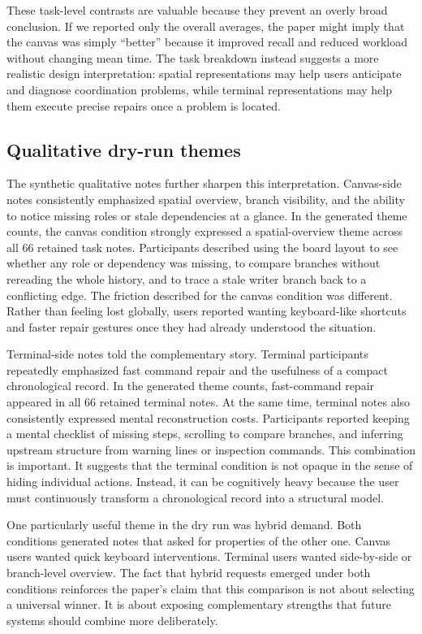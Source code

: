 \documentclass[sigconf]{acmart}
\begin{document}
These task-level contrasts are valuable because they prevent an overly broad conclusion. If we reported only the overall averages, the paper might imply that the canvas was simply ``better'' because it improved recall and reduced workload without changing mean time. The task breakdown instead suggests a more realistic design interpretation: spatial representations may help users anticipate and diagnose coordination problems, while terminal representations may help them execute precise repairs once a problem is located.

\subsection{Qualitative dry-run themes}

The synthetic qualitative notes further sharpen this interpretation. Canvas-side notes consistently emphasized spatial overview, branch visibility, and the ability to notice missing roles or stale dependencies at a glance. In the generated theme counts, the canvas condition strongly expressed a spatial-overview theme across all 66 retained task notes. Participants described using the board layout to see whether any role or dependency was missing, to compare branches without rereading the whole history, and to trace a stale writer branch back to a conflicting edge. The friction described for the canvas condition was different. Rather than feeling lost globally, users reported wanting keyboard-like shortcuts and faster repair gestures once they had already understood the situation.

Terminal-side notes told the complementary story. Terminal participants repeatedly emphasized fast command repair and the usefulness of a compact chronological record. In the generated theme counts, fast-command repair appeared in all 66 retained terminal notes. At the same time, terminal notes also consistently expressed mental reconstruction costs. Participants reported keeping a mental checklist of missing steps, scrolling to compare branches, and inferring upstream structure from warning lines or inspection commands. This combination is important. It suggests that the terminal condition is not opaque in the sense of hiding individual actions. Instead, it can be cognitively heavy because the user must continuously transform a chronological record into a structural model.

One particularly useful theme in the dry run was hybrid demand. Both conditions generated notes that asked for properties of the other one. Canvas users wanted quick keyboard interventions. Terminal users wanted side-by-side or branch-level overview. The fact that hybrid requests emerged under both conditions reinforces the paper's claim that this comparison is not about selecting a universal winner. It is about exposing complementary strengths that future systems should combine more deliberately.
\end{document}
